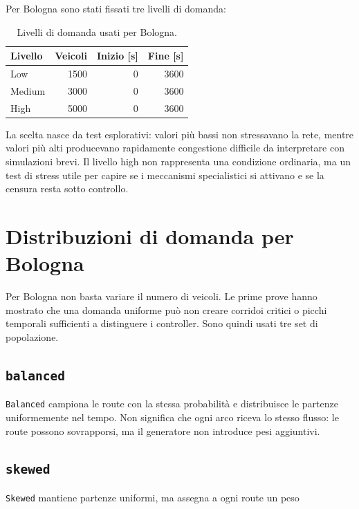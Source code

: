 \documentclass[12pt,a4paper,oneside]{report}
\numberwithin{equation}{chapter}
\begin{document}
Per Bologna sono stati fissati tre livelli di domanda:

\begin{table}[htbp]
    \centering
    \caption{Livelli di domanda usati per Bologna.}
    \label{tab:bologna-demand}
    \begin{tabular}{lrrr}
        \toprule
        Livello & Veicoli & Inizio [s] & Fine [s] \\
        \midrule
        Low & 1500 & 0 & 3600 \\
        Medium & 3000 & 0 & 3600 \\
        High & 5000 & 0 & 3600 \\
        \bottomrule
    \end{tabular}
\end{table}

La scelta nasce da test esplorativi: valori più bassi non stressavano la rete,
mentre valori più alti producevano rapidamente congestione difficile da
interpretare con simulazioni brevi. Il livello high non rappresenta una condizione
ordinaria, ma un test di stress utile per capire se i meccanismi specialistici
si attivano e se la censura resta sotto controllo.

\section{Distribuzioni di domanda per Bologna}

Per Bologna non basta variare il numero di veicoli. Le prime prove hanno
mostrato che una domanda uniforme può non creare corridoi critici o picchi
temporali sufficienti a distinguere i controller. Sono quindi usati tre set di
popolazione.

\subsection{\texttt{balanced}}

\texttt{Balanced} campiona le route con la stessa probabilità e distribuisce le
partenze uniformemente nel tempo. Non significa che ogni arco riceva lo stesso
flusso: le route possono sovrapporsi, ma il generatore non introduce pesi
aggiuntivi.

\subsection{\texttt{skewed}}

\texttt{Skewed} mantiene partenze uniformi, ma assegna a ogni route un peso
\end{document}
